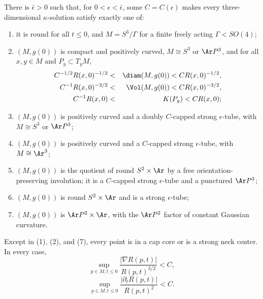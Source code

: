 \begin{theorem}\label{thm:kappa-solution-structure-summary}
\label{kappasummary}
There is $\bar\epsilon>0$ such that, for
$0<\epsilon<\bar\epsilon$, some $C=C(\epsilon)$ makes every
three-dimensional $\kappa$-solution satisfy exactly one of:
\begin{enumerate}
\item[(1)] it is round for all $t\leq0$, and $M=S^3/\Gamma$ for a
finite freely acting $\Gamma<SO(4)$;
\item[(2)] $(M,g(0))$ is compact and positively curved,
$M\cong S^3$ or $\Ar P^3$, and for all $x,y\in M$ and
$P_y\subset T_yM$,
\begin{eqnarray*}
 C^{-1/2}R(x,0)^{-1/2}&<&\diam(M,g(0))<CR(x,0)^{-1/2},\\
 C^{-1}R(x,0)^{-3/2}&<&\Vol(M,g(0))<CR(x,0)^{-3/2},\\
 C^{-1}R(x,0)&<&K(P_y)<CR(x,0);
\end{eqnarray*}
\item[(3)] $(M,g(0))$ is positively curved and a doubly
$C$-capped strong $\epsilon$-tube, with
$M\cong S^3$ or $\Ar P^3$;
\item[(4)] $(M,g(0))$ is positively curved and a $C$-capped strong
$\epsilon$-tube, with $M\cong\Ar^3$;
\item[(5)] $(M,g(0))$ is the quotient of round
$S^2\times\Ar$ by a free orientation-preserving involution; it is a
$C$-capped strong $\epsilon$-tube and a punctured $\Ar P^3$;
\item[(6)] $(M,g(0))$ is round $S^2\times\Ar$ and is a strong
$\epsilon$-tube;
\item[(7)] $(M,g(0))$ is $\Ar P^2\times\Ar$, with the
$\Ar P^2$ factor of constant Gaussian curvature.
\end{enumerate}
Except in (1), (2), and (7), every point is in a cap core or is a
strong neck center. In every case,
\begin{equation}\label{nablaR}
 \sup_{p\in M,t\leq0}\frac{|\nabla R(p,t)|}{R(p,t)^{3/2}}<C,
\end{equation}
\begin{equation}\label{dRdt}
 \sup_{p\in M,t\leq0}\frac{|\partial_tR(p,t)|}{R(p,t)^2}<C.
\end{equation}
\end{theorem}

